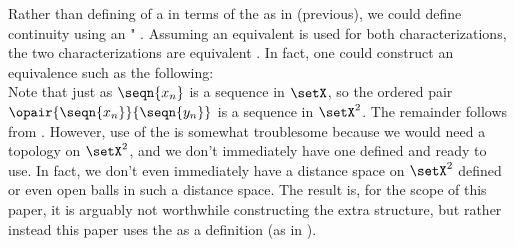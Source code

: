 \begin{remark}
Rather than defining  of a  in terms of 
the  as in  (previous),
we could define continuity using an " .
Assuming an equivalent  is used for both characterizations, the 
two characterizations are equivalent .
In fact, one could construct an equivalence such as the following:
\\
Note that just as $\seqn{x_n}$ is a sequence in $\setX$, so the ordered pair $\opair{\seqn{x_n}}{\seqn{y_n}}$
is a sequence in $\setX^2$.
The remainder %
follows from .
However, use of the  is somewhat troublesome
because we would need a topology on $\setX^2$, and we don't immediately have one defined and ready to use.
In fact, we don't even immediately have a distance space on $\setX^2$ defined or even open balls in such a distance space.
The result is, for the scope of this paper, it is arguably not worthwhile constructing the extra structure, 
but rather instead this paper
uses the  as a definition (as in ).
\end{remark}



